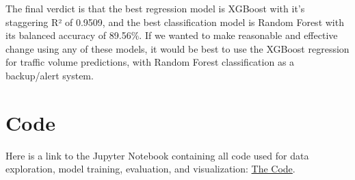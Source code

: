 \documentclass[12pt]{article}
\begin{document}
The final verdict is that the best regression model is XGBoost with it's staggering R² of 0.9509, and the best classification model is Random Forest with its balanced accuracy of 89.56\%.
If we wanted to make reasonable and effective change using any of these models, it would be best to use the XGBoost regression for traffic volume predictions, with Random Forest classification as a backup/alert system.

\section{Code}

Here is a link to the Jupyter Notebook containing all code used for data exploration, model training, evaluation, and visualization: \href{https://colab.research.google.com/drive/1BKRMXI40PGC_hTNV45E3-m17CC6Ntb2-?usp=sharing}{The Code}.
\end{document}
